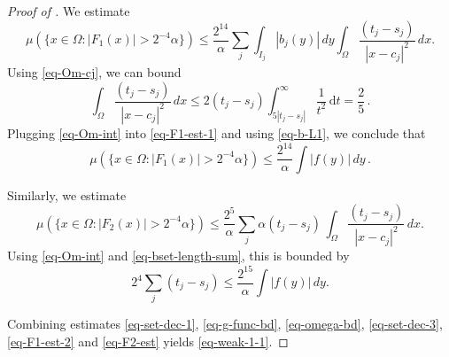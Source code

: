 \begin{proof}[Proof of ]
We estimate
\begin{equation}
    \label{eq-F1-est-1}
    \mu(\{x\in \Omega: |F_1(x)|> 2^{-4}\alpha\})\leq \frac{2^{14}}{\alpha}\sum_{j} \int_{I_j} |b_j(y)|\, dy\int_{\Omega} \frac{(t_j-s_j)}{|x-c_j|^2}\, dx.
\end{equation}
Using \eqref{eq-Om-cj}, we can bound
\begin{equation}
    \label{eq-Om-int}
    \int_{\Omega} \frac{(t_j-s_j)}{|x-c_j|^2}\, dx \le 2(t_j - s_j) \int_{5|t_j - s_j|}^\infty \frac{1}{t^2} \, \mathrm{d}t = \frac{2}{5}\,.
\end{equation}
Plugging \eqref{eq-Om-int} into \eqref{eq-F1-est-1} and using \eqref{eq-b-L1}, we conclude that
\begin{equation}
    \label{eq-F1-est-2}
    \mu(\{x\in \Omega: |F_1(x)|>2^{-4}\alpha\})\leq \frac{2^{14}}{\alpha}\int |f(y)|\,dy\,.
\end{equation}

Similarly, we estimate
$$\mu(\{x\in \Omega: |F_2(x)|>2^{-4} \alpha\})\leq \frac{2^{5}}{\alpha}\sum_{j} \alpha (t_j-s_j)\, \int_{\Omega} \frac{(t_j-s_j)}{|x-c_j|^2}\, dx.$$
Using \eqref{eq-Om-int} and \eqref{eq-bset-length-sum}, this is bounded by
\begin{equation}
\label{eq-F2-est}
2^{4}\sum_{j} (t_j-s_j)\leq \frac{2^{15}}{\alpha}\int |f(y)|\, dy.
\end{equation}

Combining estimates \eqref{eq-set-dec-1}, \eqref{eq-g-func-bd}, \eqref{eq-omega-bd}, \eqref{eq-set-dec-3}, \eqref{eq-F1-est-2} and \eqref{eq-F2-est} yields \eqref{eq-weak-1-1}.
\end{proof}
















































